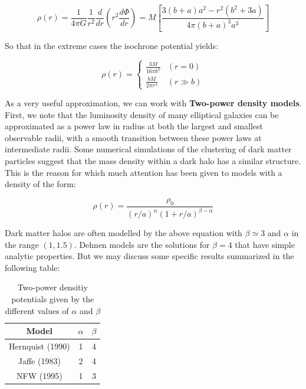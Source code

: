 \begin{equation}
\rho(r)=\frac{1}{4\pi G}\frac{1}{r^{2}}\frac{d}{dr}\left(r^{2}\frac{d\Phi}{dr}\right)=M\left[\frac{3\left(b+a\right)a^{2}-r^{2}(b^{2}+3a)}{4\pi(b+a)^{3}a^{3}}\right]
\end{equation}

So that in the extreme cases the isochrone potential yields:

\begin{equation}
\rho(r) = \left\lbrace
\begin{array}{ll}
\frac{3M}{16\pi b^{3}} & (r=0)\\
\frac{bM}{2\pi r^{4}} & (r\gg b)
\end{array}
\right.
\end{equation} 

As a very useful approximation, we can work with \textbf{Two-power density models}. First, we note that the luminosity density of many elliptical galaxies can be approximated as a power law in radius at both the largest and smallest observable radii, with a smooth transition between these power laws at intermediate radii. Some numerical simulations of the clustering of dark matter particles suggest that the mass density within a dark halo has a similar structure. This is the reason for which much attention has been given to models with a density of the form:

\begin{equation}
\rho(r)=\frac{\rho_{0}}{\left(r/a\right)^{\alpha}\left(1+r/a\right)^{\beta-\alpha}}
\end{equation}

Dark matter halos are often modelled by the above equation with $\beta\simeq3$ and $\alpha$ in the range $(1,1.5)$. Dehnen models are the solutions for $\beta =4$ that have simple analytic properties. But we may discuss some specific results summarized in the following table:

\begin{table}[H]
\begin{center}
  \begin{tabular}{| c|  c|  c| }
    \hline
    \textbf{Model} & $\alpha $ & $\beta $ \\ \hline
    Hernquist (1990) & 1 & 4 \\ \hline
    Jaffe (1983) & 2 & 4 \\ \hline
    NFW (1995) & 1 & 3 \\
    \hline
  \end{tabular}
\end{center} 
\caption[Two power density potentials]{Two-power densitiy potentials given by the different values of $\alpha$ and $\beta$}
\end{table}

